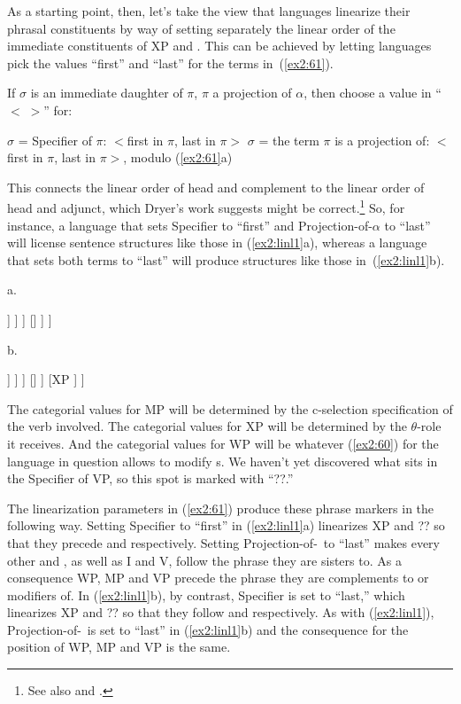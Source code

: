 As a starting point, then, let's take the view that languages linearize their phrasal constituents by way of setting separately the linear order of the immediate constituents of XP and . This can be achieved by letting languages pick the values ``first'' and ``last'' for the terms in~(\ref{ex2:61}).
\begin{exe}
	\ex \label{ex2:61} If $\sigma$ is an immediate daughter of $\pi$, $\pi$ a projection of $\alpha$, then choose a value in ``$<\;>$'' for:
	\begin{xlist}
	\ex $\sigma$ = Specifier of $\pi$: $<$first in $\pi$, last in $\pi$$>$
	\ex $\sigma$ = the term $\pi$ is a projection of: $<$first in $\pi$, last in $\pi$$>$, modulo (\ref{ex2:61}a)
	\end{xlist}
\end{exe}
This connects the linear order of head and complement to the linear order of head and adjunct, which Dryer's work suggests might be correct.\footnote{See also \citet{Saito:1985} and \citet{Saito:1998}.} So, for instance, a language that sets Specifier to ``first'' and Projection-of-$\alpha$ to ``last'' will license sentence structures like those in (\ref{ex2:linl1}a), whereas a language that sets both terms to ``last'' will produce structures like those in~(\ref{ex2:linl1}b).
\begin{exe}
\ex \label{ex2:linl1} 
a. \small
\begin{forest}
[IP
	[XP ]
	[\ibar{I} 
		[VP 
			[?? ]
			[\ibar{V}
				[WP ]
				[\ibar{V} 
					[MP ]
					[\obar{V} ]
				 ]
			 ]
		]
		[]
	 ]
]
\end{forest}
b. \small
\begin{forest}
[IP
	[\ibar{I} 
		[VP 
			[?? ]
			[\ibar{V}
				[WP ]
				[\ibar{V} 
					[MP ]
					[\obar{V} ]
				 ]
			 ]
		]
		[]
	 ]
	[XP ]
]
\end{forest}
\end{exe}
The categorial values for MP will be determined by the \mbox{c-selection} specification of the verb involved. The categorial values for XP will be determined by the \mbox{$\theta$-role} it receives. And the categorial values for WP will be whatever (\ref{ex2:60}) for the language in question allows to modify s. We haven't yet discovered what sits in the Specifier of VP, so this spot is marked with ``??.''

The linearization parameters in (\ref{ex2:61}) produce these phrase markers in the following way. Setting Specifier to ``first'' in (\ref{ex2:linl1}a) linearizes XP and ?? so that they precede  and  respectively. Setting Projection-of-\al\ to ``last'' makes every other  and , as well as I and V, follow the phrase they are sisters to. As a consequence WP, MP and VP precede the phrase they are complements to or modifiers of. In (\ref{ex2:linl1}b), by contrast, Specifier is set to ``last,'' which linearizes XP and ?? so that they follow  and  respectively. As with (\ref{ex2:linl1}), Projection-of-\al\ is set to ``last'' in (\ref{ex2:linl1}b) and the consequence for the position of WP, MP and VP is the same.

